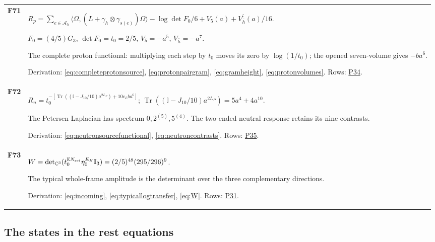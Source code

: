\documentclass[aps,prx,onecolumn,10pt,notitlepage,nofootinbib,longbibliography]{revtex4-2}
\numberwithin{equation}{section}
\numberwithin{table}{section}
\newcommand{\Id}{\mathbb I}
\newcommand{\CC}{\mathbb C}
\newcommand{\EE}{\mathbb E}
\newcommand{\Tr}{\operatorname{Tr}}
\begin{document}
\begin{longtable}{@{}>{\raggedright\arraybackslash}p{}>{\raggedright\arraybackslash}p{}@{}}
\hypertarget{formula-F71}{}\textbf{F71}\label{formula:F71} & $R_p=\sum_{e\in\mathcal A_h}\langle\Omega,(L+\gamma_h\otimes\gamma_{s(e)})\Omega\rangle-\log\det F_0/6+V_5(a)+V_{\bar h}^\prime(a)/16$.\par $F_0=(4/5)G_3$, $\det F_0=t_0=2/5$, $V_5=-a^5$, $V_{\bar h}=-a^7$.\par
The complete proton functional: multiplying each step by $t_0$ moves its zero by $\log(1/t_0)$; the opened seven-volume gives $-ba^6$.\par
Derivation: \eqref{eq:completeprotonsource}, \eqref{eq:protonpairgram}, \eqref{eq:gramheight}, \eqref{eq:protonvolumes}. Rows: \hyperlink{row-P34}{P34}.\\[7pt]
\hypertarget{formula-F72}{}\textbf{F72}\label{formula:F72} & $R_n=t_0^{-[\Tr((\Id-J_{10}/10)a^{2L_P})+10c_Lba^6]}$; $\Tr((\Id-J_{10}/10)a^{2L_P})=5a^4+4a^{10}$.\par
The Petersen Laplacian has spectrum $0,2^{(5)},5^{(4)}$. The two-ended neutral response retains its nine contrasts.\par
Derivation: \eqref{eq:neutronsourcefunctional}, \eqref{eq:neutroncontrasts}. Rows: \hyperlink{row-P35}{P35}.\\[7pt]
\hypertarget{formula-F73}{}\textbf{F73}\label{formula:F73} & $W=\det_{\CC^3}(t_0^{\EE N_{\rm ret}}\eta_0^{E_H}\Id_3)=(2/5)^{48}(295/296)^9$.\par
The typical whole-frame amplitude is the determinant over the three complementary directions.\par
Derivation: \eqref{eq:incoming}, \eqref{eq:typicallogtransfer}, \eqref{eq:W}. Rows: \hyperlink{row-P31}{P31}.\\[7pt]
\end{longtable}
\endgroup

\subsection{The states in the rest equations}
\end{document}
